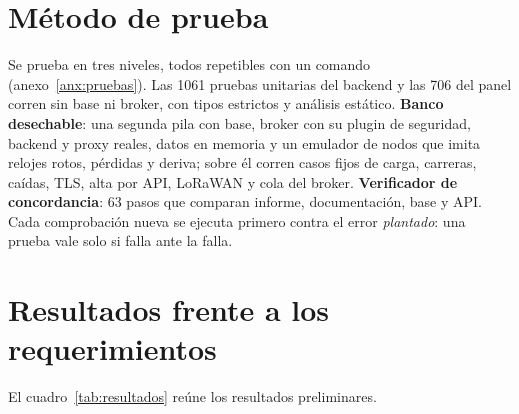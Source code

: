 \section{Método de prueba}

Se prueba en tres niveles, todos repetibles con un comando (anexo~\ref{anx:pruebas}). Las 1061 pruebas unitarias del backend y las 706 del panel corren sin base ni broker, con tipos estrictos y análisis estático. \textbf{Banco
desechable}: una segunda pila con base, broker con su plugin de seguridad, backend y proxy reales, datos en memoria y un
emulador de nodos que imita relojes rotos, pérdidas y deriva; sobre él corren casos fijos de carga, carreras,
caídas, TLS, alta por API, LoRaWAN y cola del broker. \textbf{Verificador de concordancia}: 63 pasos que comparan informe, documentación, base y API. Cada comprobación nueva se ejecuta primero contra el error \emph{plantado}: una prueba vale solo si falla ante la falla.

\section{Resultados frente a los requerimientos}

El cuadro~\ref{tab:resultados} reúne los resultados preliminares.


